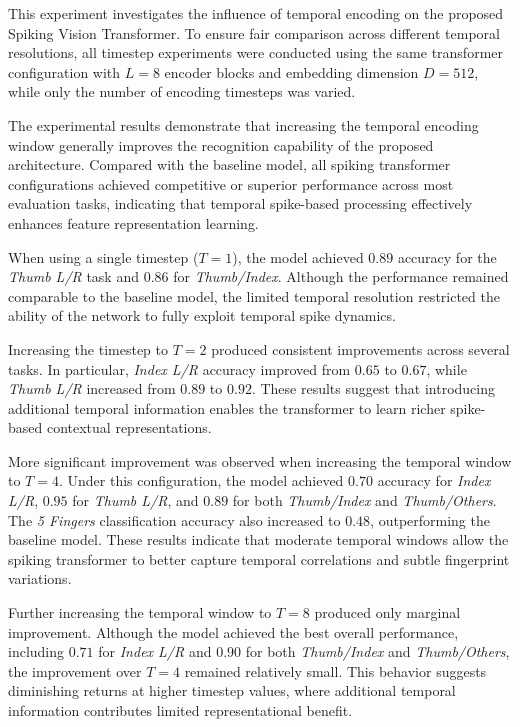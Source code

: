\documentclass[../main.tex]{subfiles}
\begin{document}
This experiment investigates the influence of temporal encoding on the proposed Spiking Vision Transformer. To ensure fair comparison across different temporal resolutions, all timestep experiments were conducted using the same transformer configuration with \(L=8\) encoder blocks and embedding dimension \(D=512\), while only the number of encoding timesteps was varied.

The experimental results demonstrate that increasing the temporal encoding window generally improves the recognition capability of the proposed architecture. Compared with the baseline model, all spiking transformer configurations achieved competitive or superior performance across most evaluation tasks, indicating that temporal spike-based processing effectively enhances feature representation learning.

When using a single timestep (\(T=1\)), the model achieved \(0.89\) accuracy for the \textit{Thumb L/R} task and \(0.86\) for \textit{Thumb/Index}. Although the performance remained comparable to the baseline model, the limited temporal resolution restricted the ability of the network to fully exploit temporal spike dynamics.

Increasing the timestep to \(T=2\) produced consistent improvements across several tasks. In particular, \textit{Index L/R} accuracy improved from \(0.65\) to \(0.67\), while \textit{Thumb L/R} increased from \(0.89\) to \(0.92\). These results suggest that introducing additional temporal information enables the transformer to learn richer spike-based contextual representations.

More significant improvement was observed when increasing the temporal window to \(T=4\). Under this configuration, the model achieved \(0.70\) accuracy for \textit{Index L/R}, \(0.95\) for \textit{Thumb L/R}, and \(0.89\) for both \textit{Thumb/Index} and \textit{Thumb/Others}. The \textit{5 Fingers} classification accuracy also increased to \(0.48\), outperforming the baseline model. These results indicate that moderate temporal windows allow the spiking transformer to better capture temporal correlations and subtle fingerprint variations.

Further increasing the temporal window to \(T=8\) produced only marginal improvement. Although the model achieved the best overall performance, including \(0.71\) for \textit{Index L/R} and \(0.90\) for both \textit{Thumb/Index} and \textit{Thumb/Others}, the improvement over \(T=4\) remained relatively small. This behavior suggests diminishing returns at higher timestep values, where additional temporal information contributes limited representational benefit.
\end{document}
